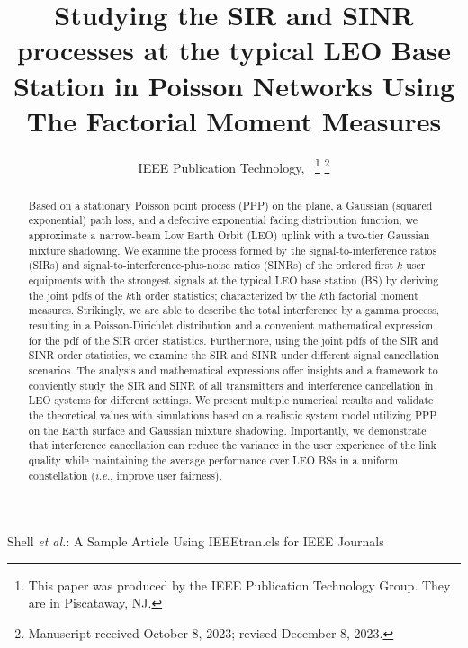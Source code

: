 \documentclass[lettersize,journal]{IEEEtran}
\begin{document}
\title{Studying the SIR and SINR processes at the typical LEO Base Station in Poisson Networks Using The Factorial Moment Measures}
\author{IEEE Publication Technology,~
\thanks{This paper was produced by the IEEE Publication Technology Group. They are in Piscataway, NJ.}%
\thanks{Manuscript received October 8, 2023; revised December 8, 2023.}}

%
{Shell \MakeLowercase{\textit{et al.}}: A Sample Article Using IEEEtran.cls for IEEE Journals}

\IEEEpubid{}


\maketitle
\begin{abstract}

  Based on a stationary Poisson point process (PPP) on the plane, a Gaussian (squared exponential) path loss, and a defective exponential fading distribution function, we approximate a narrow-beam Low Earth Orbit (LEO) uplink with a two-tier Gaussian mixture shadowing. We examine the process formed by the signal-to-interference ratios (SIRs) and signal-to-interference-plus-noise ratios (SINRs) of the ordered first $k$ user equipments with the strongest signals at the typical LEO base station (BS) by deriving the joint pdfs of the $k$th order statistics; characterized by the $k$th factorial moment measures. Strikingly, we are able to describe the total interference by a gamma process, resulting in a Poisson-Dirichlet distribution and a convenient mathematical expression for the pdf of the SIR order statistics. Furthermore, using the joint pdfs of the SIR and SINR order statistics, we examine the SIR and SINR under different signal cancellation scenarios. The analysis and mathematical expressions offer insights and a framework to conviently study the SIR and SINR of all transmitters and interference cancellation in LEO systems for different settings. We present multiple numerical results and validate the theoretical values with simulations based on a realistic system model utilizing PPP on the Earth surface and Gaussian mixture shadowing. Importantly, we demonstrate that interference cancellation can reduce the variance in the user experience of the link quality while maintaining the average performance over LEO BSs in a uniform constellation (\textit{i.e.}, improve user fairness).


\end{abstract}
\end{document}
